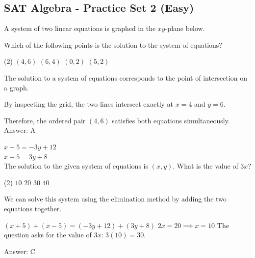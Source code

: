 \documentclass[11pt,paper=a4,answers]{exam}
\begin{document}
\begin{questions}
\section*{SAT Algebra - Practice Set 2 (Easy)}

\question
A system of two linear equations is graphed in the $xy$-plane below.
\begin{center}
\end{center}
Which of the following points is the solution to the system of equations?
\begin{tasks}(2)
\task $(4, 6)$
\task $(6, 4)$
\task $(0, 2)$
\task $(5, 2)$
\end{tasks}

\begin{solution}
The solution to a system of equations corresponds to the point of intersection on a graph.
\vspace{5pt}
\begin{center}
By inspecting the grid, the two lines intersect exactly at $x = 4$ and $y = 6$.
\end{center}
\vspace{5pt}
Therefore, the ordered pair $(4, 6)$ satisfies both equations simultaneously.
\vspace{5pt}
Answer: \colorbox{yellow!100}{A}
\end{solution}

\vspace{1cm}

\question
$x + 5 = -3y + 12$ \\
$x - 5 = 3y + 8$ \\
The solution to the given system of equations is $(x, y)$. What is the value of $3x$?
\begin{tasks}(2)
\task $10$
\task $20$
\task $30$
\task $40$
\end{tasks}

\begin{solution}
We can solve this system using the elimination method by adding the two equations together.
\vspace{5pt}
\begin{center}
$(x + 5) + (x - 5) = (-3y + 12) + (3y + 8)$
\vspace{5pt}
$2x = 20 \implies x = 10$
\vspace{5pt}
The question asks for the value of $3x$: $3(10) = 30$.
\end{center}
\vspace{5pt}
Answer: \colorbox{yellow!100}{C}
\end{solution}


\end{questions}
\end{document}
